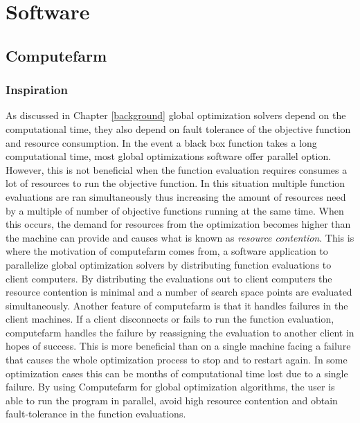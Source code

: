 \chapter{Software}
\label{methods}
\section{Computefarm}
\label{computefarm}
\subsection{Inspiration}
As discussed in Chapter \ref{background} global optimization solvers depend on the computational time, they also depend on fault tolerance of the objective function and resource consumption. In the event a black box function takes a long computational time, most global optimizations software offer parallel option. However, this is not beneficial when the function evaluation requires consumes a lot of resources to run the objective function. In this situation multiple function
evaluations are ran simultaneously thus increasing the amount of resources need by a multiple of number of objective functions running at the same time. When this occurs, the demand for resources from the optimization becomes higher than the machine can provide and causes what is known as \textit{resource contention}. 
  This is where the motivation of computefarm comes from, a software application to parallelize global optimization solvers by distributing function evaluations to client computers. By distributing the evaluations out to client computers the resource contention is minimal and a number of search space points are evaluated simultaneously. Another feature of computefarm is that it handles failures in the client machines. If a client disconnects or
  fails to run the function evaluation, computefarm handles the failure by reassigning the evaluation to another client in hopes of success. This is more beneficial than on a single machine facing a failure that causes the whole optimization process to stop and to restart again. In some optimization cases this can be months of computational time lost due to a single failure. By using Computefarm for global optimization algorithms, the user is able to run the program in parallel, avoid high
  resource contention and obtain fault-tolerance in the function evaluations.   
  
